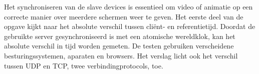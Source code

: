 Het synchroniseren van de slave devices is essentieel om video of animatie op een correcte manier over meerdere schermen weer te geven. Het eerste deel van de opgave kijkt naar het absolute verschil tussen cliënt- en referentietijd. Doordat de gebruikte server gesynchroniseerd is met een atomische wereldklok, kan het absolute verschil in tijd worden gemeten. De testen gebruiken verscheidene besturingssystemen, aparaten en browsers. Het verslag licht ook het verschil tussen UDP en TCP, twee verbindingprotocols, toe.